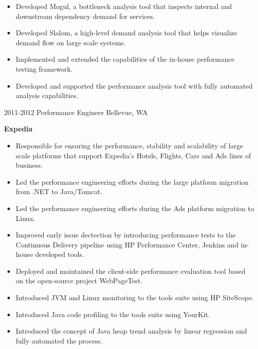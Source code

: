 \begin{entrylist}
{\begin{itemize}
        \item Developed Mogul, a bottleneck analysis tool that inspects internal and downstream dependency demand for services.
        \item Developed Slalom, a high-level demand analysis tool that helps visualize demand flow on large scale systems.
        \item Implemented and extended the capabilities of the in-house performance testing framework.
        \item Developed and supported the performance analysis tool with fully automated analysis capabilities.
      \end{itemize}
    }
  \entry
    {2011-2012}
    {Performance Engineer}
    {Bellevue, WA}
    {
      \textbf{Expedia}
      \begin{itemize}
        \item Responsible for ensuring the performance, stability and scalability of large scale platforms that support Expedia's Hotels, Flights, Cars and Ads lines of business.
        \item Led the performance engineering efforts during the large platform migration from .NET to Java/Tomcat.
        \item Led the performance engineering efforts during the Ads platform migration to Linux.
        \item Improved early issue dectection by introducing performance tests to the Continuous Delivery pipeline using HP Performance Center, Jenkins and in-house developed tools.
        \item Deployed and maintained the client-side performance evaluation tool based on the open-source project WebPageTest.
        \item Introduced JVM and Linux monitoring to the tools suite using HP SiteScope.
        \item Introduced Java code profiling to the tools suite using YourKit.
        \item Introduced the concept of Java heap trend analysis by linear regression and fully automated the process.

\end{itemize}}
\end{entrylist}
